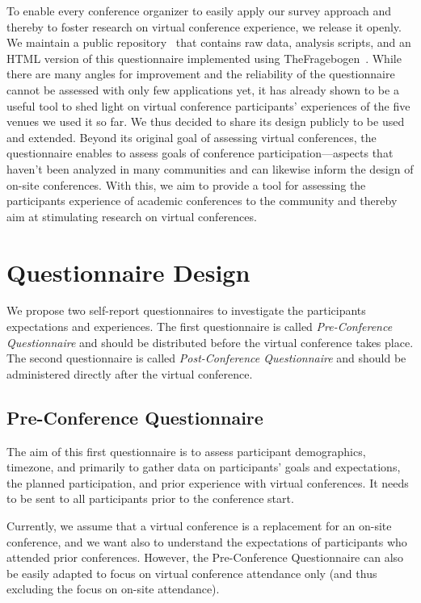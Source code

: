 \documentclass[sigconf]{acmart}
\newcommand{\afblock}[1]{\noindent{\textbf{#1 }}}
\begin{document}
\afblock{Survey Tool Release.}
To enable every conference organizer to easily apply our survey approach and thereby to foster research on virtual conference experience, we release it openly.
We maintain a public repository~\cite{VirtualConferencesGithub} that contains raw data, analysis scripts, and an HTML version of this questionnaire implemented using TheFragebogen~\cite{TheFragebogen}.
While there are many angles for improvement and the reliability of the questionnaire cannot be assessed with only few applications yet, it has already shown to be a useful tool to shed light on virtual conference participants' experiences of the five venues we used it so far.
We thus decided to share its design publicly to be used and extended.
Beyond its original goal of assessing virtual conferences, the questionnaire enables to assess goals of conference participation---aspects that haven't been analyzed in many communities and can likewise inform the design of on-site conferences.
With this, we aim to provide a tool for assessing the participants experience of academic conferences to the community and thereby aim at stimulating research on virtual conferences.

\section{Questionnaire Design}
We propose two self-report questionnaires to investigate the participants expectations and experiences.
The first questionnaire is called \textit{Pre-Conference Questionnaire} and should be distributed before the virtual conference takes place.
The second questionnaire is called \textit{Post-Conference Questionnaire} and should be administered directly after the virtual conference.

\subsection{Pre-Conference Questionnaire}
The aim of this first questionnaire is to assess participant demographics, timezone, and primarily to gather data on participants' goals and expectations, the planned participation, and prior experience with virtual conferences.
It needs to be sent to all participants prior to the conference start.

Currently, we assume that a virtual conference is a replacement for an on-site conference, and we want also to understand the expectations of participants who attended prior conferences.
However, the Pre-Conference Questionnaire can also be easily adapted to focus on virtual conference attendance only (and thus excluding the focus on on-site attendance).
\end{document}
